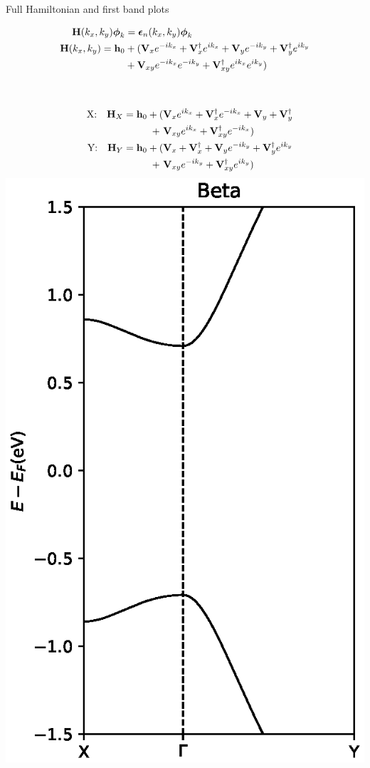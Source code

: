 \documentclass[hyperref={colorlinks=true,urlcolor=blue,linkcolor=.},aspectratio=1610,mathserif]{beamer}
\newcommand{\im}[3]{\inputminted[linenos=true, python3=true, firstline=#2, lastline=#3]{python}{#1}}
\begin{document}
\begin{frame}{Full Hamiltonian and first band plots}
	\begin{overprint}
		\begin{align}
			\vb{H}(k_x,k_y) \vb*{\phi}_k & = \vb*{\epsilon}_n\pqty{k_x,k_y}\vb*{\phi}_k\nonumber                                                               \\
			\vb{H}(k_x,k_y) = \vb{h}_0   & + (\vb{V}_{x}e^{-ik_x} + \vb{V}_{x}^{\dagger}e^{ik_x} + \vb{V}_{y}e^{-ik_y} + \vb{V}_{y}^{\dagger}e^{ik_y}\nonumber \\
			                             & + \vb{V}_{xy}e^{-ik_x}e^{-ik_y} + \vb{V}_{xy}^{\dagger}e^{ik_x}e^{ik_y})\nonumber
		\end{align}
		\im{Listings/Functions.py}{73}{80}
		\begin{columns}[c]
			\begin{align}
				\qq{X:} \vb{H}_{X} = \vb{h}_0 + ( & \vb{V}_{x}e^{ik_x} + \vb{V}_{x}^{\dagger}e^{-ik_x} + \vb{V}_{y} + \vb{V}_{y}^{\dagger}\nonumber \\
				+\                                & \vb{V}_{xy}e^{ik_x} + \vb{V}_{xy}^{\dagger}e^{-ik_x}) \nonumber                                 \\
				\qq{Y:} \vb{H}_{Y} = \vb{h}_0 + ( & \vb{V}_{x} + \vb{V}_{x}^{\dagger} + \vb{V}_{y}e^{-ik_y} + \vb{V}_{y}^{\dagger}e^{ik_y}\nonumber \\
				+\                                & \vb{V}_{xy}e^{-ik_y} + \vb{V}_{xy}^{\dagger}e^{ik_y}) \nonumber
			\end{align}
			\includegraphics[width=.65\textwidth]{Figures/BetaBandstructures.eps}
		\end{columns}
	\end{overprint}
\end{frame}
\end{document}
